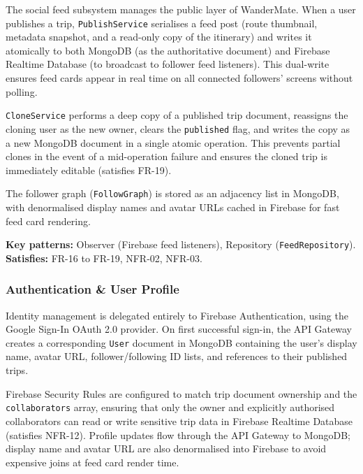 \documentclass[12pt, a4paper]{article}
\begin{document}
The social feed subsystem manages the public layer of WanderMate. When a user publishes a trip, \texttt{PublishService} serialises a feed post (route thumbnail, metadata snapshot, and a read-only copy of the itinerary) and writes it atomically to both MongoDB (as the authoritative document) and Firebase Realtime Database (to broadcast to follower feed listeners). This dual-write ensures feed cards appear in real time on all connected followers' screens without polling.

\texttt{CloneService} performs a deep copy of a published trip document, reassigns the cloning user as the new owner, clears the \texttt{published} flag, and writes the copy as a new MongoDB document in a single atomic operation. This prevents partial clones in the event of a mid-operation failure and ensures the cloned trip is immediately editable (satisfies FR-19).

The follower graph (\texttt{FollowGraph}) is stored as an adjacency list in MongoDB, with denormalised display names and avatar URLs cached in Firebase for fast feed card rendering.

\begin{tcolorbox}[notebox]
  \textbf{Key patterns:} Observer (Firebase feed listeners), Repository (\texttt{FeedRepository}).\\[2pt]
  \textbf{Satisfies:} FR-16 to FR-19, NFR-02, NFR-03.
\end{tcolorbox}

\subsubsection{Authentication \& User Profile}

Identity management is delegated entirely to Firebase Authentication, using the Google Sign-In OAuth 2.0 provider. On first successful sign-in, the API Gateway creates a corresponding \texttt{User} document in MongoDB containing the user's display name, avatar URL, follower/following ID lists, and references to their published trips.

Firebase Security Rules are configured to match trip document ownership and the \texttt{collaborators} array, ensuring that only the owner and explicitly authorised collaborators can read or write sensitive trip data in Firebase Realtime Database (satisfies NFR-12). Profile updates flow through the API Gateway to MongoDB; display name and avatar URL are also denormalised into Firebase to avoid expensive joins at feed card render time.
\end{document}
